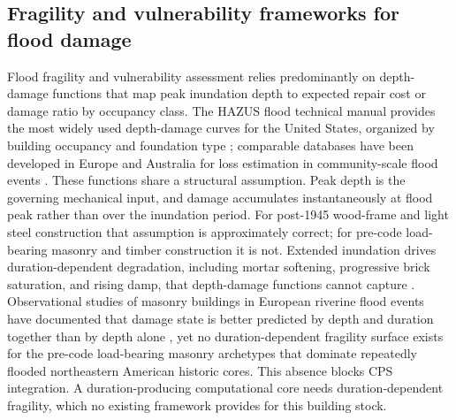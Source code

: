 \documentclass[11pt]{article}
\begin{document}
\subsection{Fragility and vulnerability frameworks for flood damage}
Flood fragility and vulnerability assessment relies predominantly on depth-damage
functions that map peak inundation depth to expected repair cost or damage ratio
by occupancy class.
The HAZUS flood technical manual provides the most widely used depth-damage curves
for the United States, organized by building occupancy and foundation type
\cite{fema2025hazus};
comparable databases have been developed in Europe and Australia for loss estimation
in community-scale flood events \cite{huizinga2017jrc,gerl2016review}.
These functions share a structural assumption. Peak depth is the governing mechanical
input, and damage accumulates instantaneously at flood peak rather than over the
inundation period.
For post-1945 wood-frame and light steel construction that assumption is
approximately correct; for pre-code load-bearing masonry and timber construction
it is not.
Extended inundation drives duration-dependent degradation, including mortar
softening, progressive brick saturation, and rising damp, that depth-damage
functions cannot capture
\cite{franzoni2015compressive,sathiparan2018effect,hall2009water}.
Observational studies of masonry buildings in European riverine flood events have
documented that damage state is better predicted by depth and duration together
than by depth alone
\cite{kelman2004overview,schwarz2008damage,milanesi2018vulnerability}, yet no
duration-dependent fragility surface exists for the pre-code load-bearing masonry
archetypes that dominate repeatedly flooded northeastern American historic cores.
This absence blocks CPS integration. A duration-producing computational core needs
duration-dependent fragility, which no existing framework provides for
this building stock.
\end{document}

